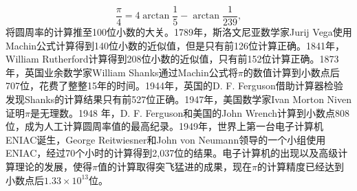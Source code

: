 \begin{example}[圆周率与统计]
\[
    \frac{\pi}{4} = 4\arctan \frac{1}{5} - \arctan \frac{1}{239},
\]
将圆周率的计算推至100位小数的大关。1789年，斯洛文尼亚数学家Jurij Vega使用Machin公式计算得到140位小数的近似值，但是只有前126位计算正确。1841年，William Rutherford计算得到208位小数的近似值，只有前152位计算正确。1873 年，英国业余数学家William Shanks通过Machin公式将$\pi$的数值计算到小数点后707位，花费了整整15年的时间。1944年，英国的D. F. Ferguson借助计算器检验发现Shanks的计算结果只有前527位正确。1947年，美国数学家Ivan Morton Niven证明$\pi$是无理数。1948 年，D. F. Ferguson和美国的John Wrench计算到小数点808位，成为人工计算圆周率值的最高纪录。1949年，世界上第一台电子计算机ENIAC诞生，George Reitwiesner和John von Neumann领导的一个小组使用ENIAC，经过70个小时的计算得到2,037位的结果。电子计算机的出现以及高级计算理论的发展，使得$\pi$值的计算取得突飞猛进的成果，现在$\pi$的计算精度已经达到小数点后$1.33\times 10^{13}$位。


\end{example}

